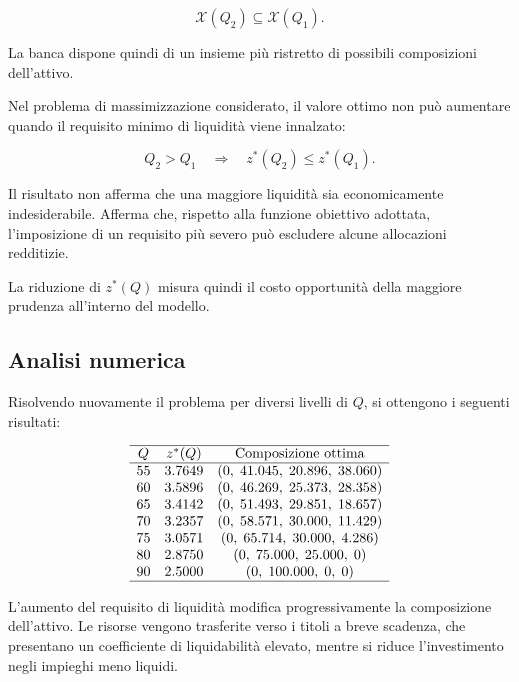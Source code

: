 \[
\mathcal{X}(Q_2)
\subseteq
\mathcal{X}(Q_1).
\]

La banca dispone quindi di un insieme pi\`u ristretto di possibili
composizioni dell'attivo.

\begin{proposition}

Nel problema di massimizzazione considerato, il valore ottimo non pu\`o
aumentare quando il requisito minimo di liquidit\`a viene innalzato:

\[
Q_2>Q_1
\quad\Longrightarrow\quad
z^*(Q_2)\leq z^*(Q_1).
\]

\end{proposition}

Il risultato non afferma che una maggiore liquidit\`a sia economicamente
indesiderabile. Afferma che, rispetto alla funzione obiettivo adottata,
l'imposizione di un requisito pi\`u severo pu\`o escludere alcune allocazioni
redditizie.

La riduzione di \(z^*(Q)\) misura quindi il costo opportunit\`a della maggiore
prudenza all'interno del modello.

\subsection{Analisi numerica}

Risolvendo nuovamente il problema per diversi livelli di \(Q\), si ottengono
i seguenti risultati:

\[
\begin{array}{ccc}
\hline
Q
&
z^*(Q)
&
\text{Composizione ottima}
\\
\hline
55
&
3.7649
&
(0,\;41.045,\;20.896,\;38.060)
\\
60
&
3.5896
&
(0,\;46.269,\;25.373,\;28.358)
\\
65
&
3.4142
&
(0,\;51.493,\;29.851,\;18.657)
\\
70
&
3.2357
&
(0,\;58.571,\;30.000,\;11.429)
\\
75
&
3.0571
&
(0,\;65.714,\;30.000,\;4.286)
\\
80
&
2.8750
&
(0,\;75.000,\;25.000,\;0)
\\
90
&
2.5000
&
(0,\;100.000,\;0,\;0)
\\
\hline
\end{array}
\]

L'aumento del requisito di liquidit\`a modifica progressivamente la
composizione dell'attivo. Le risorse vengono trasferite verso i titoli a breve
scadenza, che presentano un coefficiente di liquidabilit\`a elevato, mentre si
riduce l'investimento negli impieghi meno liquidi.

